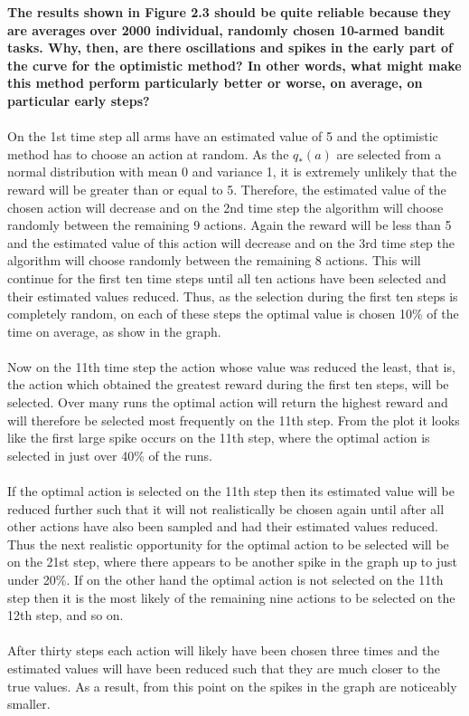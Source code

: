 \documentclass[a4paper,11pt]{article}
\numberwithin{equation}{section}
\theoremstyle{remark}
\begin{document}
\textbf{The results shown in Figure 2.3 should be quite reliable because they are averages over 2000 individual, randomly chosen 10-armed bandit tasks. Why, then, are there oscillations and spikes in the early part of the curve for the optimistic method? In other words, what might make this method perform particularly better or worse, on average, on particular early steps?}
\\ \\ 
On the 1st time step all arms have an estimated value of 5 and the optimistic method has to choose an action at random. As the $q_*(a)$ are selected from a normal distribution with mean 0 and variance 1, it is extremely unlikely that the reward will be greater than or equal to 5. Therefore, the estimated value of the chosen action will decrease and on the 2nd time step the algorithm will choose randomly between the remaining 9 actions. Again the reward will be less than 5 and the estimated value of this action will decrease and on the 3rd time step the algorithm will choose randomly between the remaining 8 actions. This will continue for the first ten time steps until all ten actions have been selected and their estimated values reduced. Thus, as the selection during the first ten steps is completely random, on each of these steps the optimal value is chosen 10\% of the time on average, as show in the graph.
\\ \\
Now on the 11th time step the action whose value was reduced the least, that is, the action which obtained the greatest reward during the first ten steps, will be selected. Over many runs the optimal action will return the highest reward and will therefore be selected most frequently on the 11th step. From the plot it looks like the first large spike occurs on the 11th step, where the optimal action is selected in just over 40\% of the runs. 
\\ \\
If the optimal action is selected on the 11th step then its estimated value will be reduced further such that it will not realistically be chosen again until after all other actions have also been sampled and had their estimated values reduced. Thus the next realistic opportunity for the optimal action to be selected will be on the 21st step, where there appears to be another spike in the graph up to just under 20\%. If on the other hand the optimal action is not selected on the 11th step then it is the most likely of the remaining nine actions to be selected on the 12th step, and so on. 
\\ \\
After thirty steps each action will likely have been chosen three times and the estimated values will have been reduced such that they are much closer to the true values. As a result, from this point on the spikes in the graph are noticeably smaller.  
\end{document}
